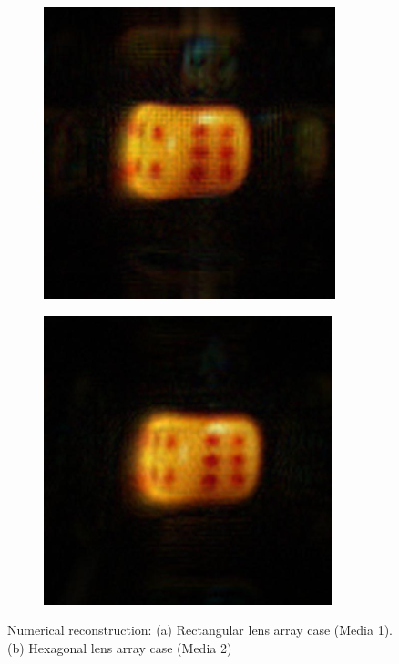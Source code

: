\documentclass[10pt,letterpaper]{article}
\begin{document}
\begin{figure}[!htb]
            \centering
	\captionsetup[subfigure]{justification=centering}
	\begin{subfigure}[b]{0.2\linewidth}
	\centering
	\includegraphics[width=1\columnwidth]{fig13_a}
	\caption{}
	\end{subfigure}
	\begin{subfigure}[b]{0.2\linewidth}
	\includegraphics[width=1\columnwidth]{fig13_b}
	\centering
	\caption{}
	\end{subfigure}
\caption{Numerical reconstruction: (a) Rectangular lens array case (Media 1). (b) Hexagonal lens array case (Media 2)}
\label{fig_13}
\end{figure}
  
\end{document}
